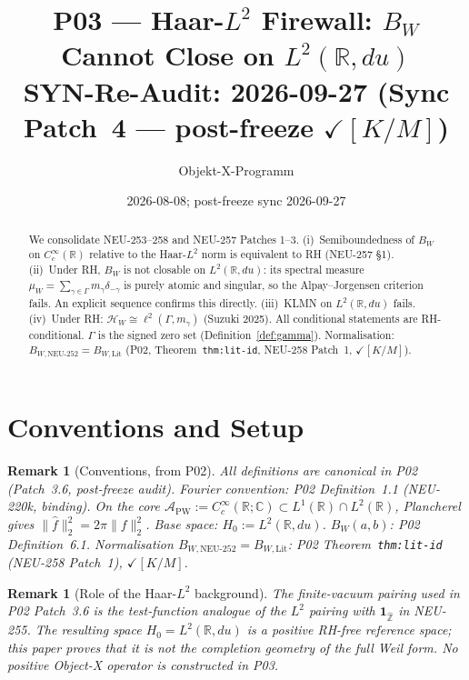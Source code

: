\documentclass[11pt,a4paper]{amsart}
\title{P03 --- Haar-$L^2$ Firewall: $B_W$ Cannot Close on $L^2(\mathbb{R},du)$\\
\normalsize SYN-Re-Audit: 2026-09-27 (Sync Patch~4 --- post-freeze $\checkmark[K/M]$)}
\author{Objekt-X-Programm}
\date{2026-08-08; post-freeze sync 2026-09-27}
\newtheorem{remark}[theorem]{Remark}
\begin{document}
\maketitle

\begin{abstract}
We consolidate NEU-253--258 and NEU-257 Patches 1--3.
(i)~Semiboundedness of $B_W$ on $C_c^\infty(\mathbb{R})$ relative
to the Haar-$L^2$ norm is equivalent to RH (NEU-257 \S1).
(ii)~Under RH, $B_W$ is not closable on $L^2(\mathbb{R},du)$:
its spectral measure $\mu_W=\sum_{\gamma\in\Gamma}m_\gamma\delta_{-\gamma}$
is purely atomic and singular, so the Alpay--Jorgensen criterion fails.
An explicit sequence confirms this directly.
(iii)~KLMN on $L^2(\mathbb{R},du)$ fails.
(iv)~Under RH: $\mathcal{H}_W\cong\ell^2(\Gamma,m_\gamma)$ (Suzuki 2025).
All conditional statements are RH-conditional.
$\Gamma$ is the signed zero set (Definition~\ref{def:gamma}).
Normalisation: $B_{W,\mathrm{NEU}\text{-}252}=B_{W,\mathrm{Lit}}$
(P02, Theorem~\texttt{thm:lit-id}, NEU-258 Patch~1, $\checkmark[K/M]$).
\end{abstract}

\section{Conventions and Setup}

\begin{remark}[Conventions, from P02]\label{rem:conv}
All definitions are canonical in P02 (Patch~3.6, post-freeze audit).
Fourier convention: P02 Definition~1.1 (NEU-220k, binding).
On the core $\mathcal{A}_{\mathrm{PW}}:=C_c^\infty(\mathbb{R};\mathbb{C})
\subset L^1(\mathbb{R})\cap L^2(\mathbb{R})$,
Plancherel gives $\|\hat f\|_2^2=2\pi\|f\|_2^2$.
Base space: $H_0:=L^2(\mathbb{R},du)$.
$B_W(a,b)$: P02 Definition~6.1.
Normalisation $B_{W,\mathrm{NEU}\text{-}252}=B_{W,\mathrm{Lit}}$:
P02 Theorem~\texttt{thm:lit-id} (NEU-258 Patch~1), $\checkmark[K/M]$.
\end{remark}

\begin{remark}[Role of the Haar-$L^2$ background]\label{rem:reference-only}
The finite-vacuum pairing used in P02 Patch~3.6 is the test-function analogue
of the $L^2$ pairing with $\mathbf 1_{\widehat{\mathbb Z}}$ in NEU-255.
The resulting space $H_0=L^2(\mathbb R,du)$ is a positive RH-free
\emph{reference space}; this paper proves that it is not the completion
geometry of the full Weil form.  No positive Object-X operator is constructed
in P03.
\end{remark}
\end{document}
